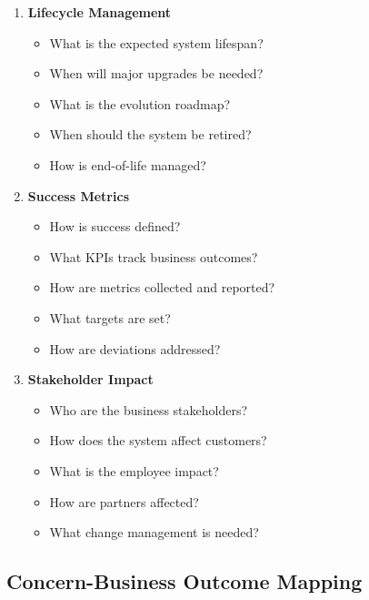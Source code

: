 \documentclass[11pt,letterpaper]{article}
\begin{document}
\begin{enumerate}[label=\textbf{C\arabic*:}, leftmargin=2.5em]
    \item \textbf{Lifecycle Management}
    \begin{itemize}[nosep]
        \item What is the expected system lifespan?
        \item When will major upgrades be needed?
        \item What is the evolution roadmap?
        \item When should the system be retired?
        \item How is end-of-life managed?
    \end{itemize}
    
    \item \textbf{Success Metrics}
    \begin{itemize}[nosep]
        \item How is success defined?
        \item What KPIs track business outcomes?
        \item How are metrics collected and reported?
        \item What targets are set?
        \item How are deviations addressed?
    \end{itemize}
    
    \item \textbf{Stakeholder Impact}
    \begin{itemize}[nosep]
        \item Who are the business stakeholders?
        \item How does the system affect customers?
        \item What is the employee impact?
        \item How are partners affected?
        \item What change management is needed?
    \end{itemize}
\end{enumerate}

\subsection{Concern-Business Outcome Mapping}
\end{document}
